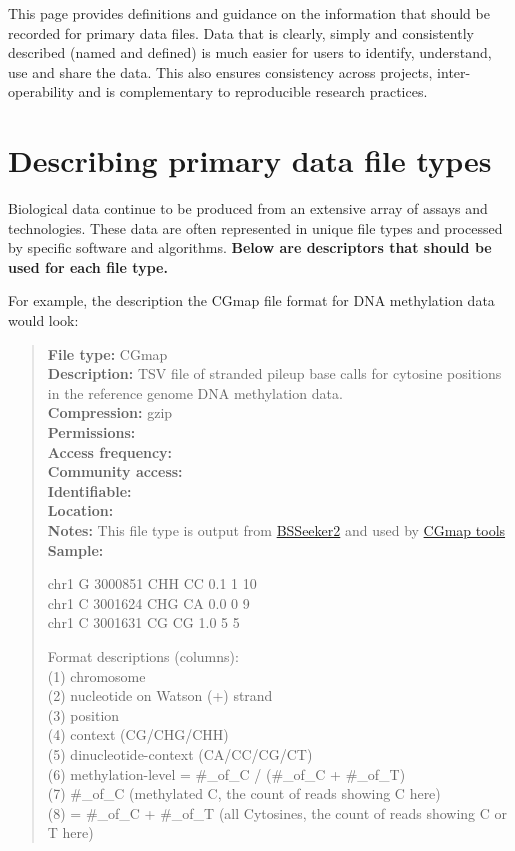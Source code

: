 \documentclass[
]{book}
\begin{document}
This page provides definitions and guidance on the information that should be recorded for primary data files. Data that is clearly, simply and consistently described (named and defined) is much easier for users to identify, understand, use and share the data. This also ensures consistency across projects, inter-operability and is complementary to reproducible research practices.

\hypertarget{describing-primary-data-file-types}{%
\section{Describing primary data file types}\label{describing-primary-data-file-types}}

Biological data continue to be produced from an extensive array of assays and technologies. These data are often represented in unique file types and processed by specific software and algorithms. \textbf{Below are descriptors that should be used for each file type.}

For example, the description the CGmap file format for DNA methylation data would look:

\begin{quote}
\textbf{File type:} CGmap\\
\textbf{Description:} TSV file of stranded pileup base calls for cytosine positions in the reference genome DNA methylation data.\\
\textbf{Compression:} gzip\\
\textbf{Permissions:}\\
\textbf{Access frequency:}\\
\textbf{Community access:}\\
\textbf{Identifiable:}\\
\textbf{Location:}\\
\textbf{Notes:} This file type is output from \href{https://github.com/BSSeeker/BSseeker2}{BSSeeker2} and used by \href{https://cgmaptools.github.io/}{CGmap tools}\\
\textbf{Sample:}

chr1 G 3000851 CHH CC 0.1 1 10\\
chr1 C 3001624 CHG CA 0.0 0 9\\
chr1 C 3001631 CG CG 1.0 5 5

Format descriptions (columns):\\
(1) chromosome\\
(2) nucleotide on Watson (+) strand\\
(3) position\\
(4) context (CG/CHG/CHH)\\
(5) dinucleotide-context (CA/CC/CG/CT)\\
(6) methylation-level = \#\_of\_C / (\#\_of\_C + \#\_of\_T)\\
(7) \#\_of\_C (methylated C, the count of reads showing C here)\\
(8) = \#\_of\_C + \#\_of\_T (all Cytosines, the count of reads showing C or T here)
\end{quote}
\end{document}
